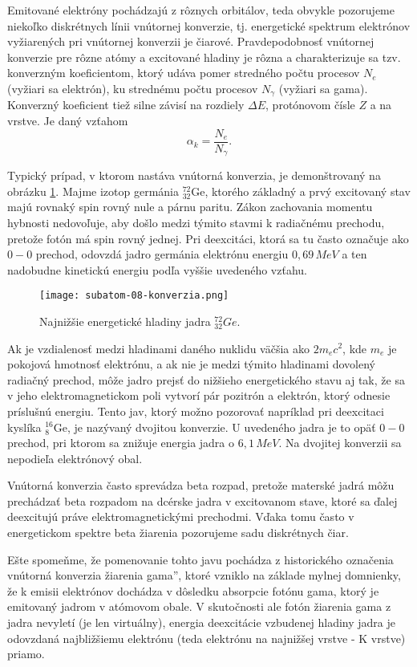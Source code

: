\documentclass[../../main.tex]{subfiles}
\begin{document}
Emitované elektróny pochádzajú z rôznych orbitálov, teda obvykle pozorujeme niekoľko diskrétnych línii vnútornej konverzie, tj. energetické spektrum elektrónov vyžiarených pri vnútornej konverzii je čiarové. Pravdepodobnosť vnútornej konverzie pre rôzne atómy a excitované hladiny je rôzna a charakterizuje sa tzv. konverzným koeficientom, ktorý udáva pomer stredného počtu procesov $N_e$ (vyžiari sa elektrón), ku strednému počtu procesov $N_{\gamma}$ (vyžiari sa gama). Konverzný koeficient tiež silne závisí na rozdiely $\Delta E$, protónovom čísle $Z$ a na vrstve. Je daný vzťahom
$$ \alpha_k = \frac{N_e}{N_{\gamma}}. $$

Typický prípad, v ktorom nastáva vnútorná konverzia, je demonštrovaný na obrázku \ref{sf8:fig:konverzia}. Majme izotop germánia $_{32}^{72}$Ge, ktorého základný a prvý excitovaný stav majú rovnaký spin rovný nule a párnu paritu. Zákon zachovania momentu hybnosti nedovoľuje, aby došlo medzi týmito stavmi k radiačnému prechodu, pretože fotón má spin rovný jednej. Pri deexcitáci, ktorá sa tu často označuje ako $0-0$ prechod, odovzdá jadro germánia elektrónu energiu $0,69\,\unit{MeV}$ a ten nadobudne kinetickú energiu podľa vyššie uvedeného vzťahu.

\begin{figure}[!h]
\texttt{[image: subatom-08-konverzia.png]}
\centering
\caption{Najnižšie energetické hladiny jadra $_{32}^{72}Ge$.}
\label{sf8:fig:konverzia}
\end{figure}

Ak je vzdialenosť medzi hladinami daného nuklidu väčšia ako $2m_ec^2$, kde $m_e$ je pokojová hmotnosť elektrónu, a ak nie je medzi týmito hladinami dovolený radiačný prechod, môže jadro prejsť do nižšieho energetického stavu aj tak, že sa v jeho elektromagnetickom poli vytvorí pár pozitrón a elektrón, ktorý odnesie príslušnú energiu. Tento jav, ktorý možno pozorovať napríklad pri deexcitaci kyslíka $_{8}^{16}$Ge, je nazývaný dvojitou konverzie. U uvedeného jadra je to opäť $0-0$ prechod, pri ktorom sa znižuje energia jadra o $6,1\,\unit{MeV}$. Na dvojitej konverzii sa nepodieľa elektrónový obal. 

Vnútorná konverzia často sprevádza  beta rozpad, pretože materské jadrá môžu prechádzať beta rozpadom na dcérske jadra v excitovanom stave, ktoré sa ďalej deexcitujú práve elektromagnetickými prechodmi. Vďaka tomu často v energetickom spektre beta žiarenia pozorujeme sadu diskrétnych čiar. 

Ešte spomeňme, že pomenovanie tohto javu pochádza z historického označenia \quotedblbase vnútorná konverzia žiarenia gama\textquotedblright , ktoré vzniklo na základe mylnej domnienky, že k emisii elektrónov dochádza v dôsledku absorpcie fotónu gama, ktorý je emitovaný jadrom v atómovom obale. V skutočnosti ale fotón žiarenia gama z jadra nevyletí (je len virtuálny), energia deexcitácie vzbudenej hladiny jadra je odovzdaná najbližšiemu elektrónu (teda elektrónu na najnižšej vrstve - K vrstve) priamo.
\end{document}
